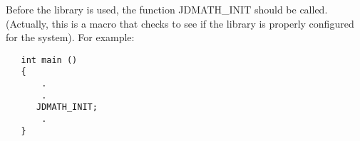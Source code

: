  Before the library is used, the function JDMATH_INIT should be called.
 (Actually, this is a macro that checks to see if the library is properly
 configured for the system).  For example:

\begin{verbatim}
   int main ()
   {
       .
       .
      JDMATH_INIT;
       .
   }
\end{verbatim}


